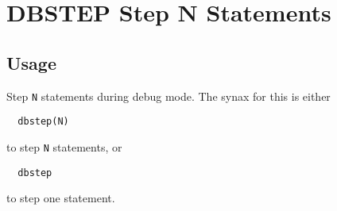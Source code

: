 \section{DBSTEP Step N Statements}

\subsection{Usage}

Step \verb|N| statements during debug mode.  The synax for this is
either
\begin{verbatim}
  dbstep(N)
\end{verbatim}
to step \verb|N| statements, or
\begin{verbatim}
  dbstep
\end{verbatim}
to step one statement.
